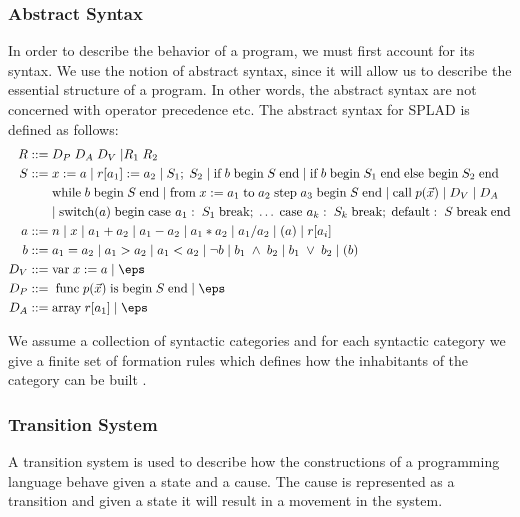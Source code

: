 \subsubsection{Abstract Syntax}
In order to describe the behavior of a program, we must first account for its syntax. We use the notion of abstract syntax, since it will allow us to describe the essential structure of a program. In other words, the abstract syntax are not concerned with operator precedence etc. The abstract syntax for SPLAD is defined as follows: 
\begin{align*}
R ::= \; & D_P \; D_A \; D_V \; | R_1 \; R_2 \; \\
S::= \; & x := a \; | \; r[a_1] := a_2 \; | \; S_1; \; S_2 \; | \; \text{if} \; b \; \text{begin} \; S \; \text{end} \; | \; \text{if} \; b \; \text{begin} \; S_1 \; \text{end} \; \text{else begin} \; S_2 \; \text{end} \\
~ & \text{while} \; b \; \text{begin} \; S \; \text{end} \; | \; \text{from} \; x := a_1 \; \text{to} \; a_2 \; \text{step} \; a_3 \; \text{begin} \; S \; \text{end} \; | \; \text{call} \; p(\vec{x}) \; | \; D_V \; | \; D_A \; \\
~ & | \; \text{switch}(a) \; \text{begin} \; \text{case } a_1: \; S_1 \; \text{break}; \; \dots \; \text{case } a_k: \; S_k \; \text{break}; \; \text{default}: \; S \; \text{break} \; \text{end} \\
a::= \; & n \; | \; x \; | \; a_1 + a_2 \; | \; a_1 - a_2 \; | \; a_1 * a_2 \; | \; a_1 / a_2 \; | \; (a) \; | \; r[a_i]\\
b::= \; &a_1 = a_2 \; | \; a_1 > a_2 \; | \; a_1 < a_2 \; | \; \neg b \; | \; b_1 \; \wedge \; b_2 \; | \; b_1 \; \vee \; b_2 \; | \; (b)\\
D_V::= \; & \text{var} \; x := a \;|\; \eps\\
D_P::= \; & \; \text{func} \; p(\vec{x}) \; \text{is} \; \text{begin} \; S \; \text{end}  \;|\; \eps\\
D_A::= \; & \text{array} \; r[a_1]  \;|\; \eps\\
\end{align*}

We assume a collection of syntactic categories and for each syntactic category we give a finite set of formation rules which defines how the inhabitants of the category can be built \citep{HHTree}.

\subsubsection{Transition System}
A transition system is used to describe how the constructions of a programming language behave given a state and a cause. The cause is represented as a transition and given a state it will result in a movement in the system.

